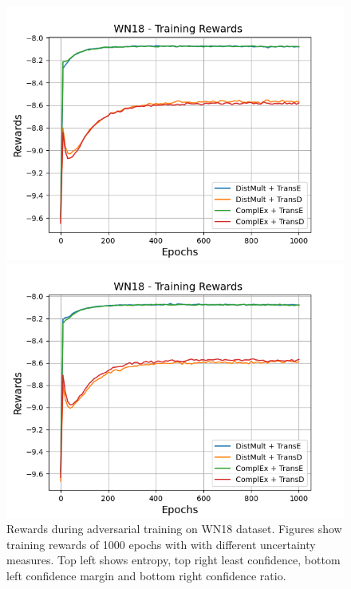 \begin{figure}[H]
\begin{minipage}{.5\textwidth}
    \end{minipage}
    \begin{minipage}{.5\textwidth}
      \centering
      \includegraphics[width=0.9\linewidth]{figures/results/gan_train/not_pretrained/uncertainty/max_distribution/confidence_margin/wn18/uncertainty_wn18_rew.png}
    \end{minipage}%
    \begin{minipage}{.5\textwidth}
      \centering
      \includegraphics[width=0.9\linewidth]{figures/results/gan_train/not_pretrained/uncertainty/max_distribution/confidence_ratio/wn18/uncertainty_wn18_rew.png}
    \end{minipage}%
    \caption{Rewards during adversarial training on \textsc{WN18} dataset. 
    Figures show training rewards of 1000 epochs with \ussoftmax with different uncertainty measures.
    Top left shows entropy, top right least confidence, 
    bottom left confidence margin and bottom right confidence ratio.}
    \label{fig:advtrain_metrics_wn18}
\end{figure}
